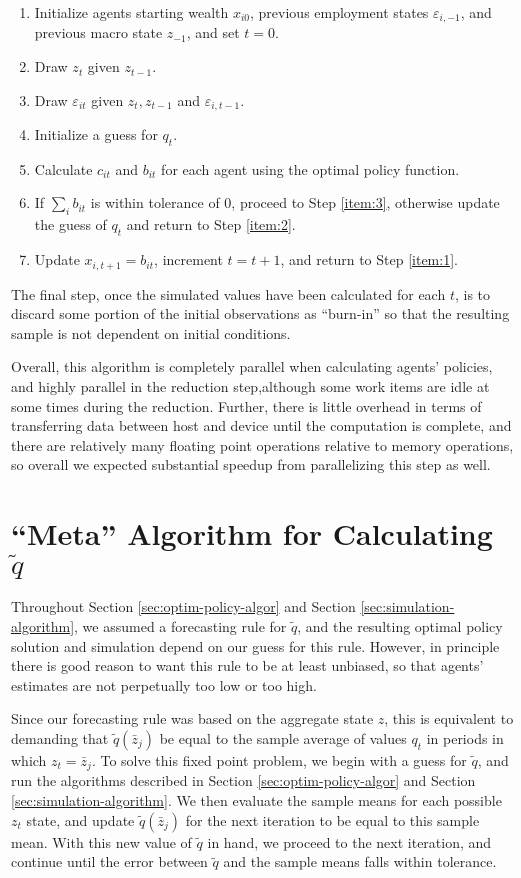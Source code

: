 \documentclass[a4paper,12pt]{article}
\newcommand{\eps}{\varepsilon}
\numberwithin{equation}{section}
\theoremstyle{definition}
\begin{document}
\begin{enumerate}
\item Initialize agents starting wealth $x_{i0}$, previous employment states $\eps_{i,-1}$, and previous macro state $z_{-1}$, and set $t = 0$.
\item \label{item:1} Draw $z_t$ given $z_{t-1}$.
\item Draw $\eps_{it}$ given $z_t, z_{t-1}$ and $\eps_{i,t-1}$.
\item Initialize a guess for $q_t$.
\item \label{item:2} Calculate $c_{it}$ and $b_{it}$ for each agent using the optimal policy function.
\item If $\sum_i b_{it}$ is within tolerance of 0, proceed to Step \ref{item:3}, otherwise update the guess of $q_t$ and return to Step \ref{item:2}.
\item \label{item:3} Update $x_{i,t+1} = b_{it}$, increment $t = t+1$, and return to Step \ref{item:1}.
\end{enumerate}

The final step, once the simulated values have been
calculated for each $t$, is to discard some portion of the initial
observations as ``burn-in'' so that the resulting sample is not
dependent on initial conditions.

Overall, this algorithm is completely parallel when calculating
agents' policies, and highly parallel in the reduction step,although
some work items are idle at some times during the reduction. Further,
there is little overhead in terms of transferring data between host
and device until the computation is complete, and there are relatively
many floating point operations relative to memory operations, so
overall we expected substantial speedup from parallelizing this step
as well.

\section{``Meta'' Algorithm for Calculating $\tilde{q}$}

Throughout Section \ref{sec:optim-policy-algor} and Section
\ref{sec:simulation-algorithm}, we assumed a forecasting rule for
$\tilde{q}$, and the resulting optimal policy solution and simulation
depend on our guess for this rule. However, in principle there is good
reason to want this rule to be at least unbiased, so that agents'
estimates are not perpetually too low or too high.

Since our forecasting rule was based on the aggregate state $z$, this
is equivalent to demanding that $\tilde{q}(\bar{z}_j)$ be equal to the
sample average of values $q_t$ in periods in which $z_t =
\bar{z}_j$. To solve this fixed point problem, we begin with a guess
for $\tilde{q}$, and run the algorithms described in Section
\ref{sec:optim-policy-algor} and Section
\ref{sec:simulation-algorithm}. We then evaluate the sample means for each possible $z_t$ state, and update $\tilde{q}(\bar{z}_j)$ for the next iteration to be equal to this sample mean. With this new value of $\tilde{q}$ in hand, we proceed to the next iteration, and continue until the error between $\tilde{q}$ and the sample means falls within tolerance.
\end{document}
